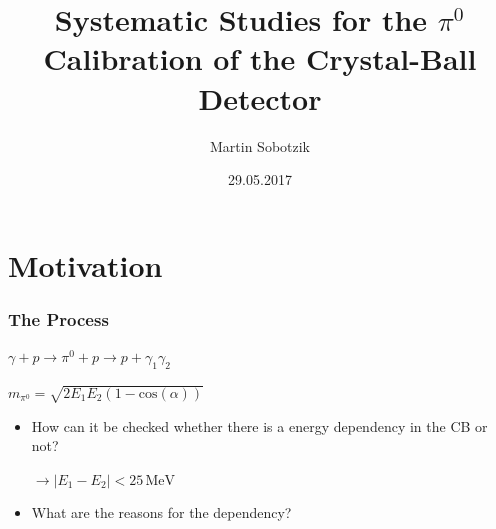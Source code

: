 \documentclass[slidestop,compress,mathserif]{beamer}
\title{Systematic Studies for the $\pi^0$ Calibration of the Crystal-Ball Detector}
\author{Martin Sobotzik}
\institute{Johannes Gutenberg-Universit\"at Mainz}
\date{29.05.2017}
\begin{document}
 

\begin{frame} 
\titlepage 
\end{frame} 


\section{Motivation}
\begin{frame}

		\frametitle{The Process}
	
		\begin{center}
		$	\gamma + p \rightarrow \pi^0 +p \rightarrow p + \gamma_1 \gamma_2$
		\end{center}
		\begin{center}
		$m_{\pi^0}=\sqrt{2 E_1E_2(1-\text{cos}(\alpha))}$
		\end{center}
		\pause
			\begin{itemize}
		\item How can it be checked whether there is a energy dependency in the CB or not?
		\pause
		 
		 
		 $\rightarrow |E_1 - E_2|<25\,\text{MeV}$
		\pause

		\item What are the reasons for the dependency?
	\end{itemize}
\end{frame}
\end{document}
